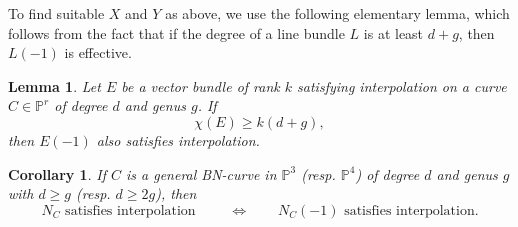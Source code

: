 \documentclass[11pt]{amsart}
\newcommand{\pp}{\mathbb{P}}
\renewcommand{\O}{\mathcal{O}}
\newtheorem{lem}[thm]{Lemma}
\newtheorem{cor}[thm]{Corollary}
\theoremstyle{definition}
\theoremstyle{remark}
\begin{document}

To find suitable $X$ and $Y$ as above, we use the following elementary lemma, which follows from the fact that if the degree of a line bundle $L$ is at least $d+g$, then $L(-1)$ is effective.
\begin{lem}
Let $E$ be a vector bundle of rank $k$ satisfying interpolation on a curve $C \in \pp^r$ of degree $d$ and genus $g$.  If 
\[\chi(E) \geq k(d + g),\]
then $E(-1)$ also satisfies interpolation.
\end{lem}
\begin{cor}\label{basecases}
If $C$ is a general BN-curve in $\pp^3$ (resp. $\pp^4$) of degree $d$ and genus $g$ with $d \geq g$ (resp. $d \geq 2g$), then 
\[N_C \text{ satisfies interpolation } \qquad \Leftrightarrow \qquad N_C(-1) \text{ satisfies interpolation.} \]
\end{cor}
\end{document}
